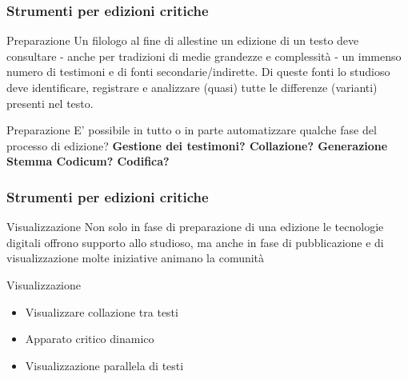 \begin{frame}
	\frametitle{Strumenti per edizioni critiche}
	\addtocounter{nframe}{1}
    \begin{block}{Preparazione}
        Un filologo al fine di allestine un edizione di un testo deve consultare - anche per tradizioni di medie grandezze e complessità - un immenso numero di testimoni e di fonti secondarie/indirette. Di queste fonti lo studioso deve identificare, registrare e analizzare (quasi) tutte le differenze (varianti) presenti nel testo.
        
	\end{block}
	\begin{block}{Preparazione}
      E' possibile in tutto o in parte automatizzare qualche fase del processo di edizione? \textbf{Gestione dei testimoni? Collazione? Generazione Stemma Codicum? Codifica?}
	\end{block}
\end{frame}

\begin{frame}
    \frametitle{Strumenti per edizioni critiche}
    \addtocounter{nframe}{1}
    
    \begin{block}{Visualizzazione}
        Non solo in fase di preparazione di una edizione le tecnologie digitali offrono supporto allo studioso, ma anche in fase di pubblicazione e di visualizzazione molte iniziative animano la comunità
    \end{block}
    
    \begin{block}{Visualizzazione}
        \begin{itemize}
            \item Visualizzare collazione tra testi
            \item Apparato critico dinamico
            \item Visualizzazione parallela di testi
        \end{itemize}
    \end{block}

\end{frame}

